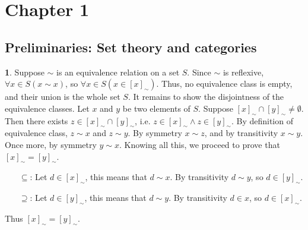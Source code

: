 \documentclass{article}
\theoremstyle{definition}
\theoremstyle{definition}
\theoremstyle{definition}
\newtheorem{solution-internal}{}[subsection]
\newenvironment{solution}{
  \medskip
  \begin{solution-internal}
}{
  \end{solution-internal}
}
\begin{document}
\section*{Chapter 1}
\subsection*{Preliminaries: Set theory and categories}
\setcounter{subsection}{1}

\begin{solution}
Suppose $\sim$ is an equivalence relation on a set $S$.
Since $\sim$ is reflexive, $\forall x \in S (x \sim x) $, so $\forall x\in S
(x \in {[x]}_{\sim})$. Thus, no equivalence class is empty, and their union is
the whole set $S$.  It remains to show the disjointness of the equivalence
classes.  Let $x$ and $y$ be two elements of $S$. Suppose ${[x]}_{\sim} \cap
{[y]}_{\sim} \neq \emptyset$. Then there exists $z \in {[x]}_{\sim} \cap
{[y]}_{\sim}$, i.e. $z \in {[x]}_{\sim} \wedge z \in {[y]}_{\sim}$. By
definition of equivalence class, $z \sim x$ and $z \sim y$. By symmetry $x \sim
z$, and by transitivity $x \sim y$. Once more, by symmetry $y \sim x$. Knowing
all this, we proceed to prove that ${[x]}_{\sim} = {[y]}_{\sim}$.
\begin{itemize}
\item[$\subseteq$:] Let $d \in {[x]}_{\sim}$, this means that $d \sim x$. By
transitivity $d \sim y$, so $d \in {[y]}_{\sim}$.
\item[$\supseteq$:] Let $d \in {[y]}_{\sim}$, this means that $d \sim y$. By
transitivity $d \in x$, so $d \in {[x]}_{\sim}$.
\end{itemize}

Thus ${[x]}_{\sim} = {[y]}_{\sim}$.
\end{solution}
\end{document}
